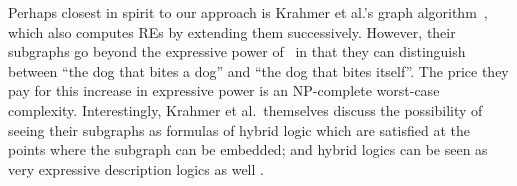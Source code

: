 Perhaps closest in spirit to our approach is Krahmer et al.'s graph
algorithm~, which also computes REs by
extending them successively.  However, their subgraphs go beyond the
expressive power of \alc\ in that they can distinguish between ``the
dog that bites a dog'' and ``the dog that bites itself''.  The price
they pay for this increase in expressive power is an NP-complete
worst-case complexity.  Interestingly, Krahmer et al.\ themselves
discuss the possibility of seeing their subgraphs as formulas of
hybrid logic which are satisfied at the points where the subgraph can
be embedded; and hybrid logics can be seen as very expressive
description logics as well \cite{arec:hybr05b}.











